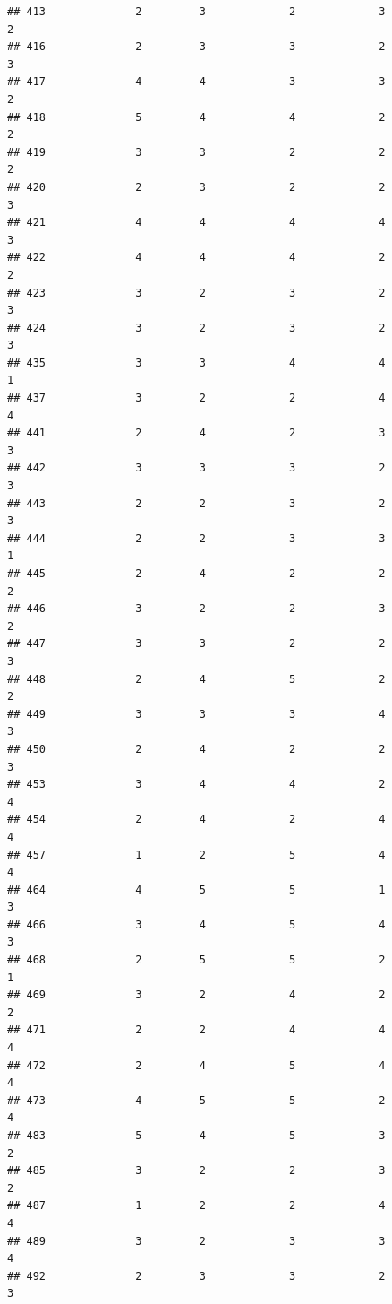 \documentclass[
]{article}
\begin{document}
\begin{verbatim}
## 413              2         3             2             3           2
## 416              2         3             3             2           3
## 417              4         4             3             3           2
## 418              5         4             4             2           2
## 419              3         3             2             2           2
## 420              2         3             2             2           3
## 421              4         4             4             4           3
## 422              4         4             4             2           2
## 423              3         2             3             2           3
## 424              3         2             3             2           3
## 435              3         3             4             4           1
## 437              3         2             2             4           4
## 441              2         4             2             3           3
## 442              3         3             3             2           3
## 443              2         2             3             2           3
## 444              2         2             3             3           1
## 445              2         4             2             2           2
## 446              3         2             2             3           2
## 447              3         3             2             2           3
## 448              2         4             5             2           2
## 449              3         3             3             4           3
## 450              2         4             2             2           3
## 453              3         4             4             2           4
## 454              2         4             2             4           4
## 457              1         2             5             4           4
## 464              4         5             5             1           3
## 466              3         4             5             4           3
## 468              2         5             5             2           1
## 469              3         2             4             2           2
## 471              2         2             4             4           4
## 472              2         4             5             4           4
## 473              4         5             5             2           4
## 483              5         4             5             3           2
## 485              3         2             2             3           2
## 487              1         2             2             4           4
## 489              3         2             3             3           4
## 492              2         3             3             2           3

\end{verbatim}
\end{document}
